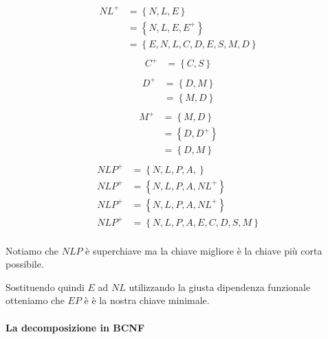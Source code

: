 \begin{exmp}
    \begin{equation}
        \begin{split}
            NL^+&= \left\{ N,L,E \right\} \\
            &= \left\{N,L,E, E^+ \right\}  \\
            &= \left\{ E,N,L,C,D,E,S,M,D\right\}  \\
        \end{split}
    \end{equation}
    \begin{equation}
        \begin{split}
            C^+&= \left\{C, S \right\} \\
        \end{split}
    \end{equation}
    \begin{equation}
        \begin{split}
            D^+&= \left\{D,  M\right\} \\
            &= \left\{ M,D\right\}  \\
        \end{split}
    \end{equation}
    \begin{equation}
        \begin{split}
            M^+&= \left\{M, D \right\} \\
            &= \left\{D, D^+ \right\}  \\
            &= \left\{ D,M\right\}  \\
        \end{split}
    \end{equation}
    \begin{equation}
        \begin{split}
            NLP^+&= \left\{N,L,P,A, \right\} \\
            NLP^+&= \left\{N,L,P,A,NL^+ \right\} \\
            NLP^+&= \left\{N,L,P,A,NL^+ \right\} \\
            NLP^+&= \left\{N,L,P,A,E,C,D,S,M \right\} \\
        \end{split}
    \end{equation}

    Notiamo che $NLP$ è superchiave ma la chiave migliore è la chiave più corta possibile.

    Sostituendo quindi $E$ ad $NL$ utilizzando la giusta dipendenza funzionale otteniamo che $EP$ è è la nostra chiave minimale.

    \paragraph{La decomposizione in BCNF}


\end{exmp}